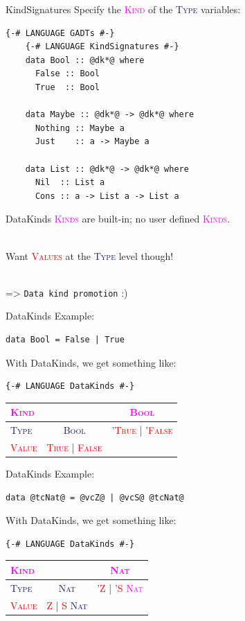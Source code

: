 \documentclass[xcolor={usenames,dvipsnames}]{beamer}
\newcommand{\htycon}[1]{\textcolor{MidnightBlue}{\textsc{#1}}}
\newcommand{\hvalcon}[1]{\textcolor{Red}{\textsc{#1}}}
\newcommand{\hkind}[1]{\textcolor{Fuchsia}{\textsc{#1}}}
\begin{document}
\begin{frame}[fragile]{KindSignatures}
  Specify the \hkind{Kind} of the \htycon{Type} variables:
  \begin{lstlisting}[style=hask]
    {-# LANGUAGE GADTs #-}
    {-# LANGUAGE KindSignatures #-}
    data Bool :: @dk*@ where
      False :: Bool
      True  :: Bool

    data Maybe :: @dk*@ -> @dk*@ where
      Nothing :: Maybe a
      Just    :: a -> Maybe a

    data List :: @dk*@ -> @dk*@ where
      Nil  :: List a
      Cons :: a -> List a -> List a
  \end{lstlisting}
\end{frame}

\begin{frame}[fragile]{DataKinds}
  \hkind{Kinds} are built-in; no user defined \hkind{Kinds}.

  \ \\
  Want \hvalcon{Values} at the \htycon{Type} level though!

  \ \\
  => \texttt{Data kind promotion} :)
\end{frame}

\begin{frame}[fragile]{DataKinds}
  Example:
  \begin{lstlisting}[style=hask]
    data Bool = False | True
  \end{lstlisting}

  With DataKinds, we get something like:
  \begin{lstlisting}[style=hask]
    {-# LANGUAGE DataKinds #-}
  \end{lstlisting}
  \begin{tabular}{l || c | c}
    \hkind{Kind} & \ & \hkind{Bool} \\
    \hline \htycon{Type} & \htycon{Bool} & \htycon{'}\hvalcon{True} | \htycon{'}\hvalcon{False} \\
    \hline \hvalcon{Value} & \hvalcon{True} | \hvalcon{False} & \ \\
  \end{tabular}
\end{frame}

\begin{frame}[fragile]{DataKinds}
  Example:
  \begin{lstlisting}[style=hask]
    data @tcNat@ = @vcZ@ | @vcS@ @tcNat@
  \end{lstlisting}

  With DataKinds, we get something like:
  \begin{lstlisting}[style=hask]
    {-# LANGUAGE DataKinds #-}
  \end{lstlisting}
  \begin{tabular}{l || c | c}
    \hkind{Kind} & \ & \hkind{Nat} \\
    \hline \htycon{Type} & \htycon{Nat} & \htycon{'}\hvalcon{Z} | \htycon{'}\hvalcon{S} \hkind{Nat} \\
    \hline \hvalcon{Value} & \hvalcon{Z} | \hvalcon{S} \htycon{Nat} & \ \\
  \end{tabular}
\end{frame}
\end{document}
